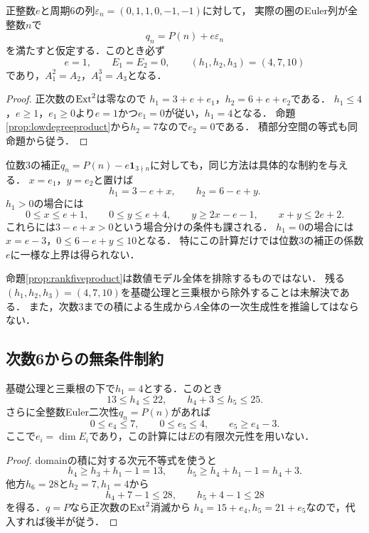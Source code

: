 \documentclass[11pt,a4paper]{ltjsarticle}
\begin{document}
\begin{proposition}\label{prop:rankfiveproduct}
正整数$e$と周期6の列$\varepsilon_n=(0,1,1,0,-1,-1)$に対して，
実際の圏のEuler列が全整数$n$で
\[
 q_n=P(n)+e\varepsilon_n
\]
を満たすと仮定する．このとき必ず
\[
 e=1,\qquad E_1=E_2=0,\qquad(h_1,h_2,h_3)=(4,7,10)
\]
であり，$A_1^2=A_2$，$A_1^3=A_3$となる．
\end{proposition}
\begin{proof}
正次数の$\operatorname{Ext}^2$は零なので
$h_1=3+e+e_1$，$h_2=6+e+e_2$である．
$h_1\leq4$，$e\geq1$，$e_1\geq0$より$e=1$かつ$e_1=0$が従い，$h_1=4$となる．
命題\ref{prop:lowdegreeproduct}から$h_2=7$なので$e_2=0$である．
積部分空間の等式も同命題から従う．
\end{proof}

位数3の補正$q_n=P(n)-e\mathbf1_{3\nmid n}$に対しても，同じ方法は具体的な制約を与える．
$x=e_1$，$y=e_2$と置けば
\[
 h_1=3-e+x,\qquad h_2=6-e+y.
\]
$h_1>0$の場合には
\[
 0\leq x\leq e+1,\qquad
 0\leq y\leq e+4,\qquad
 y\geq2x-e-1,\qquad x+y\leq2e+2.
\]
これらには$3-e+x>0$という場合分けの条件も課される．
$h_1=0$の場合には$x=e-3$，$0\leq6-e+y\leq10$となる．
特にこの計算だけでは位数3の補正の係数$e$に一様な上界は得られない．

命題\ref{prop:rankfiveproduct}は数値モデル全体を排除するものではない．
残る$(h_1,h_2,h_3)=(4,7,10)$を基礎公理と三乗根から除外することは未解決である．
また，次数3までの積による生成から$A$全体の一次生成性を推論してはならない．



\subsection{次数6からの無条件制約}
\begin{proposition}\label{prop:h6bounds}
基礎公理と三乗根の下で$h_1=4$とする．このとき
\[
 13\leq h_4\leq22,\qquad h_4+3\leq h_5\leq25.
\]
さらに全整数Euler二次性$q_n=P(n)$があれば
\[
 0\leq e_4\leq7,\qquad0\leq e_5\leq4,
 \qquad e_5\geq e_4-3.
\]
ここで$e_i=\dim E_i$であり，この計算には$E$の有限次元性を用いない．
\end{proposition}
\begin{proof}
domainの積に対する次元不等式を使うと
\[
 h_4\geq h_3+h_1-1=13,\qquad
 h_5\geq h_4+h_1-1=h_4+3.
\]
他方$h_6=28$と$h_2=7,h_1=4$から
\[
 h_4+7-1\leq28,\qquad h_5+4-1\leq28
\]
を得る．$q=P$なら正次数の$\operatorname{Ext}^2$消滅から
$h_4=15+e_4,h_5=21+e_5$なので，代入すれば後半が従う．
\end{proof}
\end{document}
